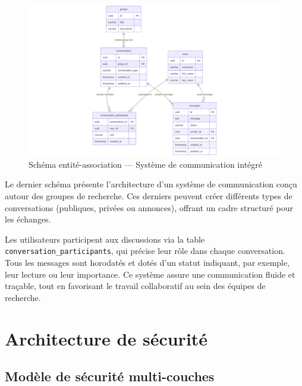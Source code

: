 \documentclass{rapportPfe}
\begin{document}
\begin{figure}[H]
    \centering
    \includegraphics[width=1.0\textwidth]{diagrams/diagram8.png}
    \caption{Schéma entité-association — Système de communication intégré}
    \label{fig:diagram8}
\end{figure}

Le dernier schéma présente l’architecture d’un système de communication conçu autour des groupes de recherche. Ces derniers peuvent créer différents types de conversations (publiques, privées ou annonces), offrant un cadre structuré pour les échanges. 

Les utilisateurs participent aux discussions via la table \texttt{conversation\_participants}, qui précise leur rôle dans chaque conversation. Tous les messages sont horodatés et dotés d’un statut indiquant, par exemple, leur lecture ou leur importance. Ce système assure une communication fluide et traçable, tout en favorisant le travail collaboratif au sein des équipes de recherche.

\FloatBarrier
\newpage
\section{Architecture de sécurité}

\subsection{Modèle de sécurité multi-couches}
\end{document}
